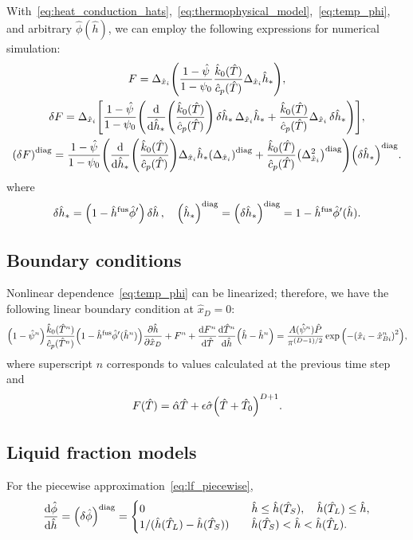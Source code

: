 \documentclass{article}
\newcommand{\dder}[2][]{\Delta_{#2}#1}
\newcommand{\diag}[1]{\qty(#1)^\mathrm{diag}}
\newcommand{\fusion}[1]{{#1}^\mathrm{fus}}
\newcommand{\Hx}{\hat{x}}
\newcommand{\Hh}{\hat{h}}
\newcommand{\HT}{\hat{T}}
\newcommand{\HP}{\hat{P}}
\newcommand{\Halpha}{\hat{\alpha}}
\newcommand{\Hsigma}{\hat{\sigma}}
\newcommand{\Hc}{\hat{c}}
\newcommand{\Hk}{\hat{k}}
\newcommand{\Hphi}{\hat{\phi}}
\newcommand{\Hpsi}{\hat{\psi}}
\begin{document}
With~\eqref{eq:heat_conduction_hats},~\eqref{eq:thermophysical_model},~\eqref{eq:temp_phi},
and arbitrary \(\Hphi(\Hh)\), we can employ the following expressions for numerical simulation:
\begin{gather}
    F = \dder{\Hx_i}\qty(
        \frac{1 - \Hpsi}{1 - \psi_0} \frac{\Hk_0(\HT)}{\Hc_p(\HT)} \dder[\Hh_*]{\Hx_i}
	), \\
    \var{F} = \dder{\Hx_i}\qty[ \frac{1 - \Hpsi}{1 - \psi_0} \qty(
	    \dv{\Hh_*}(\frac{\Hk_0(\HT)}{\Hc_p(\HT)})\var{\Hh_*}\dder[\Hh_*]{\Hx_i} +
	    \frac{\Hk_0(\HT)}{\Hc_p(\HT)} \dder[\var{\Hh_*}]{\Hx_i}
	)], \\
    \diag{\var{F}} = \frac{1 - \Hpsi}{1 - \psi_0} \qty(
	    \dv{\Hh_*}(\frac{\Hk_0(\HT)}{\Hc_p(\HT)})\dder[\Hh_*]{\Hx_i} \diag{\dder{\Hx_i}} +
	    \frac{\Hk_0(\HT)}{\Hc_p(\HT)} \diag{\dder{\Hx_i}^2}
	)\diag{\var{\Hh_*}}.
\end{gather}
where
\begin{equation}
    \var{\Hh_*} = \qty(1 - \fusion{\Hh}\hat\phi')\var{\Hh}, \quad
    \diag{\Hh_*} = \diag{\var{\Hh_*}} = 1 - \fusion{\Hh}\hat\phi'(\Hh).
\end{equation}

\subsection{Boundary conditions}

Nonlinear dependence~\eqref{eq:temp_phi} can be linearized; therefore, we have the following linear boundary condition at \(\Hx_D=0\):
\begin{equation}\label{eq:bc_linearized}
    \qty(1 - \Hpsi^n) \frac{\Hk_0(\HT^n)}{\Hc_p(\HT^n)} \qty(1-\fusion{\Hh}\hat\phi'(\Hh^n))\pdv{\Hh}{\Hx_D} +
	    F^n + \dv{F^n}{\HT}\dv{\HT^n}{\Hh}\qty(\Hh - \Hh^n) =
	    \frac{A(\Hpsi^n)\HP}{\pi^{(D-1)/2}}\exp\qty( -\qty(\Hx_i-\Hx_{Bi}^n)^2 ),
\end{equation}
where superscript \(n\) corresponds to values calculated at the previous time step and
\begin{equation}\label{eq:bc_Dirichlet_part}
    F(\HT) = \Halpha\HT + \epsilon\Hsigma\qty(\HT + \HT_0)^{D+1}.
\end{equation}

\subsection{Liquid fraction models}

For the piecewise approximation~\eqref{eq:lf_piecewise},
\begin{equation}
	\dv{\Hphi}{\Hh} = \diag{\var{\Hphi}} = \begin{cases}
        0 & \quad \Hh \leq \Hh(\HT_S), \quad \Hh(\HT_L) \leq \Hh, \\
        1/(\Hh(\HT_L)-\Hh(\HT_S)) & \quad \Hh(\HT_S) < \Hh < \Hh(\HT_L). \\
    \end{cases} \label{eq:pert_phi_h_diag}
\end{equation}
\end{document}
